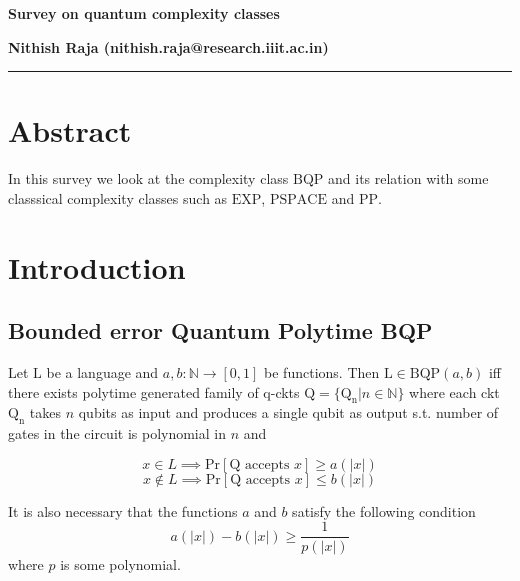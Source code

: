 



\noindent\textbf{\Large Survey on quantum complexity classes}
\vspace{2em}

\noindent
\textbf{Nithish Raja (nithish.raja@research.iiit.ac.in)}\\

\hrule

\section{Abstract}

In this survey we look at the complexity class $\mathrm{BQP}$ and its relation with some classsical complexity classes such as $\mathrm{EXP}$, $\mathrm{PSPACE}$ and $\mathrm{PP}$.

\section{Introduction}

\subsection{Bounded error Quantum Polytime BQP}

Let $\mathrm{L}$ be a language and $a, b: \mathbb{N}\rightarrow [0,1]$ be functions. Then $\mathrm{L} \in \mathrm{BQP}(a,b)$ iff there exists polytime generated family of q-ckts $\mathrm{Q} = \{\mathrm{Q_n}|n\in \mathbb{N}\}$ where each ckt $\mathrm{Q_n}$ takes $n$ qubits as input and produces a single qubit as output s.t. number of gates in the circuit is polynomial in $n$ and

\begin{equation*}
    x \in L \implies \mathrm{Pr}[\mathrm{Q}\text{ accepts }x] \ge a(|x|)
\end{equation*}
\begin{equation*}
    x \not\in L \implies \mathrm{Pr}[\mathrm{Q}\text{ accepts }x] \le b(|x|)
\end{equation*}

\noindent It is also necessary that the functions $a$ and $b$ satisfy the following condition
\begin{equation*}
    a(|x|) - b(|x|) \ge \frac{1}{p(|x|)}
\end{equation*}
where $p$ is some polynomial.






